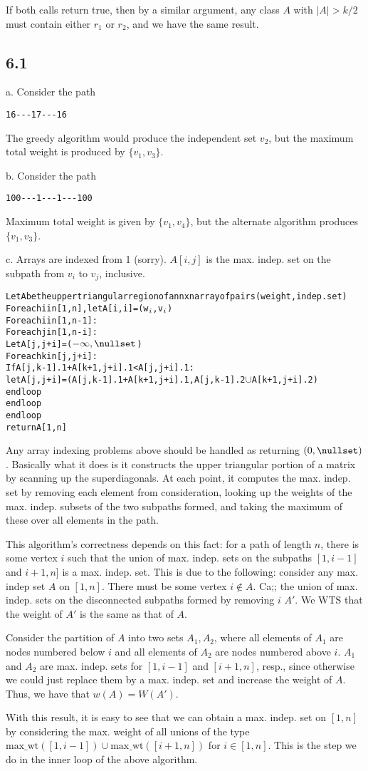 \documentclass{article}
\begin{document}
If both calls return true, then by a similar argument, any class $A$ with $|A|>k/2$ must contain either $r_1$ or $r_2$, and we have the same result.
\subsection*{6.1}
a. Consider the path \begin{verbatim}16---17---16\end{verbatim} The greedy algorithm would produce the independent set $v_2$, but the maximum total weight is produced by $\{v_1,v_3\}$.

\noindent b. Consider the path \begin{verbatim}100---1---1---100\end{verbatim} Maximum total weight is given by $\{v_1,v_4\}$, but the alternate algorithm produces $\{v_1,v_3\}$.

\noindent c. Arrays are indexed from 1 (sorry). $A[i,j]$ is the max. indep. set on the subpath from $v_i$ to $v_j$, inclusive.
\begin{alltt}
Let A be the upper triangular region of an nxn array of pairs (weight, indep. set)
For each i in [1,n], let A[i,i]=(w\(\sb{i}\),v\(\sb{i}\))
For each i in [1,n-1]:
    For each j in [1,n-i]:
        Let A[j,j+i]=(\(-\infty,\nullset\))
        For each k in [j,j+i]:
            If A[j,k-1].1+A[k+1,j+i].1<A[j,j+i].1:
                let A[j,j+i]=(A[j,k-1].1+A[k+1,j+i].1,A[j,k-1].2\(\cup\)A[k+1,j+i].2)
        end loop
    end loop
end loop
return A[1,n]
\end{alltt}

Any array indexing problems above should be handled as returning $(0,\nullset)$. Basically what it does is it constructs the upper triangular portion of a matrix by scanning up the superdiagonals. At each point, it computes the max. indep. set by removing each element from consideration, looking up the weights of the max. indep. subsets of the two subpaths formed, and taking the maximum of these over all elements in the path.

This algorithm's correctness depends on this fact: for a path of length $n$, there is some vertex $i$ such that the union of max. indep. sets on the subpaths $[1,i-1]$ and $i+1,n]$ is a max. indep. set. This is due to the following: consider any max. indep set $A$ on $[1,n]$. There must be some vertex $i\not\in A$. Ca;; the union of max. indep. sets on the disconnected subpaths formed by removing $i$ $A'$. We WTS that the weight of $A'$ is the same as that of $A$. 

Consider the partition of $A$ into two sets $A_1,A_2$, where all elements of $A_1$ are nodes numbered below $i$ and all elements of $A_2$ are nodes numbered above $i$. $A_1$ and $A_2$ are max. indep. sets for $[1,i-1]$ and $[i+1,n]$, resp., since otherwise we could just replace them by a max. indep. set and increase the weight of $A$. Thus, we have that $w(A)=W(A')$.

With this result, it is easy to see that we can obtain a max. indep. set on $[1,n]$ by considering the max. weight of all unions of the type $\text{max\_wt}([1,i-1])\cup\text{max\_wt}([i+1,n])$ for $i\in[1,n]$. This is the step we do in the inner loop of the above algorithm. 
\end{document}
